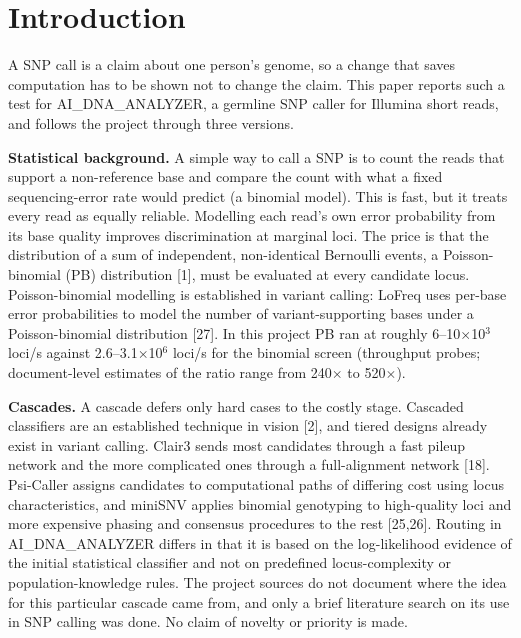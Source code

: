\documentclass[11pt,a4paper]{article}
\begin{document}
\section{\texorpdfstring{Introduction}{Introduction}}
A SNP call is a claim about one person's genome, so a change that saves computation has to be shown not to change the claim. This paper reports such a test for AI\_DNA\_ANALYZER, a germline SNP caller for Illumina short reads, and follows the project through three versions.

\textbf{Statistical background.} A simple way to call a SNP is to count the reads that support a non-reference base and compare the count with what a fixed sequencing-error rate would predict (a binomial model). This is fast, but it treats every read as equally reliable. Modelling each read's own error probability from its base quality improves discrimination at marginal loci. The price is that the distribution of a sum of independent, non-identical Bernoulli events, a Poisson-binomial (PB) distribution [1], must be evaluated at every candidate locus. Poisson-binomial modelling is established in variant calling: LoFreq uses per-base error probabilities to model the number of variant-supporting bases under a Poisson-binomial distribution [27]. In this project PB ran at roughly 6--10$\times$10$^{3}$ loci/s against 2.6--3.1$\times$10$^{6}$ loci/s for the binomial screen (throughput probes; document-level estimates of the ratio range from 240$\times$ to 520$\times$).

\textbf{Cascades.} A cascade defers only hard cases to the costly stage. Cascaded classifiers are an established technique in vision [2], and tiered designs already exist in variant calling. Clair3 sends most candidates through a fast pileup network and the more complicated ones through a full-alignment network [18]. Psi-Caller assigns candidates to computational paths of differing cost using locus characteristics, and miniSNV applies binomial genotyping to high-quality loci and more expensive phasing and consensus procedures to the rest [25,26]. Routing in AI\_DNA\_ANALYZER differs in that it is based on the log-likelihood evidence of the initial statistical classifier and not on predefined locus-complexity or population-knowledge rules. The project sources do not document where the idea for this particular cascade came from, and only a brief literature search on its use in SNP calling was done. No claim of novelty or priority is made.
\end{document}
